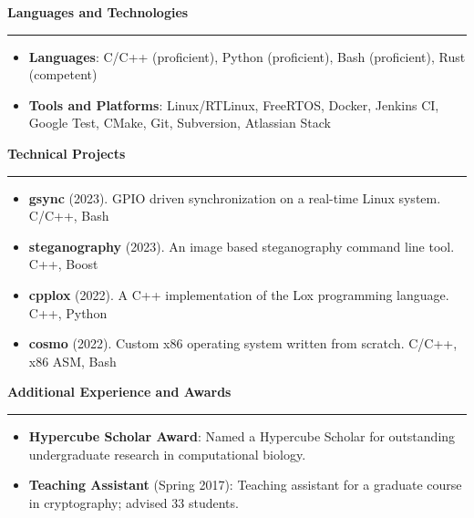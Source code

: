 \documentclass[11pt,letterpaper]{article}
\begin{document}
\medskip

\begin{large}
    \textbf{Languages and Technologies}
\end{large}

\smallskip \hrule \smallskip

\begin{itemize}[topsep=0pt]
    \setlength\itemsep{0.2em}
    \item \textbf{Languages}: C/C++ (proficient),
                              Python (proficient),
                              Bash (proficient),
                              Rust (competent)
    \item \textbf{Tools and Platforms}: Linux/RTLinux,
                                        FreeRTOS,
                                        Docker,
                                        Jenkins CI,
                                        Google Test,
                                        CMake,
                                        Git,
                                        Subversion,
                                        Atlassian Stack
\end{itemize}

\medskip

\begin{large}
    \textbf{Technical Projects}
\end{large}

\smallskip \hrule \smallskip

\begin{itemize}[topsep=0pt]
    \setlength\itemsep{0.2em}
    \item \textbf{gsync} (2023). GPIO driven synchronization on a real-time
                                 Linux system. C/C++, Bash
    \item \textbf{steganography} (2023). An image based steganography command
                                         line tool. C++, Boost
    \item \textbf{cpplox} (2022). A C++ implementation of the Lox programming
                                  language. C++, Python
    \item \textbf{cosmo} (2022). Custom x86 operating system written from
                                 scratch. C/C++, x86 ASM, Bash
\end{itemize}

\medskip

\begin{large}
    \textbf{Additional Experience and Awards}
\end{large}

\smallskip \hrule \smallskip

\begin{itemize}[topsep=0pt]
    \setlength\itemsep{0.2em}
    \item \textbf{Hypercube Scholar Award}: Named a Hypercube Scholar for
          outstanding undergraduate research in computational biology.
    \item \textbf{Teaching Assistant} (Spring 2017): Teaching assistant for a
          graduate course in cryptography; advised 33 students.
\end{itemize}
\end{document}
